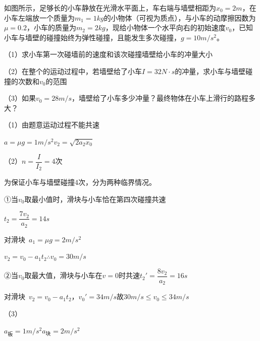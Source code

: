 \begin{problem}[21，15分]
如图所示，足够长的小车静放在光滑水平面上，车右端与墙壁相距为$x_0=2\unit{m}$，在小车左端放一个质量为$m_1=1\unit{kg}$的小物体（可视为质点），与小车的动摩擦因数为$\mu=0.2$，小车的质量为$m_2=2\unit{kg}$，现给小物体一个水平向右的初始速度$v_0$，已知小车与墙壁的碰撞始终为弹性碰撞，且能发生多次碰撞，$g=10\unit{m/s^2}$。

（1）求小车第一次碰墙前的速度和该次碰撞墙壁给小车的冲量大小\ 

（2）在整个的运动过程中，若墙壁给了小车$I=32\unit{N\cdot s}$的冲量，求小车与墙壁碰撞的次数和$v_0$的范围\ 

（3）如果$v_0=28\unit{m/s}$，墙壁给了小车多少冲量？最终物体在小车上滑行的路程多大？\ %
\begin{solution}
（1）由题意运动过程不能共速

$a=\mu g=1\unit{m/s^2}$\quad $v_2=\sqrt{2a_2x_0}$%

（2）$n=\dfrac{I}{I_2}=4$次

为保证小车与墙壁碰撞4次，分为两种临界情况。

①当$v_0$取最小值时，滑块与小车恰在第四次碰撞共速

$t_2=\dfrac{7v_2}{a_2}=14\unit{s}$

对滑块\ $a_1=\mu g=2\unit{m/s^2}$\quad {}\quad {}

$v_2=v_0-a_1t_2$\quad $\therefore v_0=30\unit{m/s}$

②当$v_0$取最大值，滑块与小车在$v=0$时共速\quad $t_2'=\dfrac{8v_2}{a_2}=16\unit{s}$

对滑块\ $v_2=v_0-a_1t_2$，$v_0'=34\unit{m/s}$\quad 故$30\unit{m/s}\le v_0\le34\unit{m/s}$

（3）


$a_{\text{板}}=1\unit{m/s^2}$\quad $a_{\text{块}}=2\unit{m/s^2}$


\end{solution}
\end{problem}
